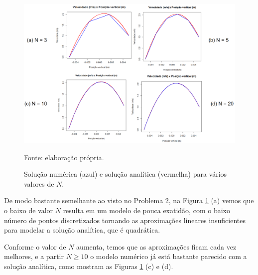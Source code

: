 \begin{figure}[h!]
    \caption{Solução numérica (azul) e solução analítica (vermelha) para vários valores de $N$.}
    \label{fig:graficoNumericoQ3}
    \centering
    \centerline{\includegraphics[scale=0.5]{graficoNumericoQ3.png}}
    \par{Fonte: elaboração própria.}
\end{figure}

De modo bastante semelhante ao visto no Problema 2, na Figura \ref*{fig:graficoNumericoQ3} (a) vemos que
o baixo de valor $N$ resulta em um modelo de pouca exatidão, com o baixo número de pontos discretizados tornando
as aproximações lineares insuficientes para modelar a solução analítica, que é quadrática.

Conforme o valor de $N$ aumenta, temos que as aproximações ficam cada vez melhores, e a partir $N \geq 10$ o modelo
numérico já está bastante parecido com a solução analítica, como mostram as Figuras \ref*{fig:graficoNumericoQ3} (c) e (d).